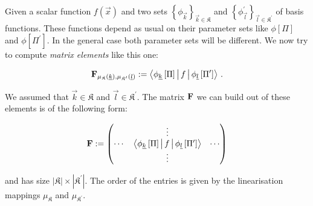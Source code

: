 Given a scalar function $f(\vec{x})$ and two sets $\left\{\phi_{\vec{k}}\right\}_{\vec{k}\in\mathfrak{K}}$
and $\left\{\phi^\prime_{\vec{l}}\right\}_{\vec{l}\in\mathfrak{K}^\prime}$ of basis functions.
These functions depend as usual on their parameter sets like $\phi\left[\Pi\right]$ and $\phi\left[\Pi^\prime\right]$.
In the general case both parameter sets will be different. We now try to compute
\emph{matrix elements} like this one:

\begin{equation}
  \mathbf{F}_{\mu_{\mathfrak{K}}(\underline{k}),\mu_{\mathfrak{K}^\prime}(\underline{l})}
  :=
  \Braket{ \phi_{\underline{k}}\left[\Pi\right] | f | \phi_{\underline{l}}\left[\Pi^\prime\right] } \,.
\end{equation}

We assumed that $\vec{k} \in \mathfrak{K}$ and $\vec{l} \in \mathfrak{K}^\prime$.
The matrix $\mathbf{F}$ we can build out of these elements is of the following form:

\begin{equation}
  \mathbf{F} :=
  \begin{pmatrix}
    {}     & \vdots                                                                                & {} \\
    \cdots & \Braket{ \phi_{\underline{k}}\left[\Pi\right] | f | \phi_{\underline{l}}\left[\Pi^\prime\right] } & \cdots \\
    {}     & \vdots                                                                                & {}
  \end{pmatrix}
\end{equation}

and has size $|\mathfrak{K}| \times |\mathfrak{K}^\prime|$. The order of the entries
is given by the linearisation mappings $\mu_{\mathfrak{K}}$ and $\mu_{\mathfrak{K}^\prime}$.

